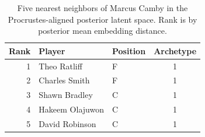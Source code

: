 \begin{table}[htbp]
  \centering\small
  \begin{tabular}{rllc}
    \toprule
    Rank & Player & Position & Archetype \\
    \midrule
    1 & Theo Ratliff & F & 1 \\
    2 & Charles Smith & F & 1 \\
    3 & Shawn Bradley & C & 1 \\
    4 & Hakeem Olajuwon & C & 1 \\
    5 & David Robinson & C & 1 \\
    \bottomrule
  \end{tabular}
  \caption{Five nearest neighbors of Marcus Camby in the Procrustes-aligned posterior latent space. Rank is by posterior mean embedding distance.}
  \label{tab:Marcus_Camby_neighbors}
\end{table}

